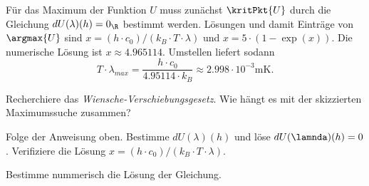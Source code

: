 \documentclass{article}
\begin{document}
    Für das Maximum der Funktion $U$ muss zunächst $\kritPkt{U}$ durch die Gleichung $dU(\lambda)(h) = 0_\R$ bestimmt werden. Lösungen und damit Einträge von $\argmax{U}$ sind $x=(h\cdot c_0)/(k_B\cdot T\cdot\lambda)$ und $x = 5\cdot (1-\exp(x))$. Die numerische Lösung ist $x\approx 4.965114$. Umstellen liefert sodann 
    \[T\cdot\lambda_\textit{max} = \frac{h\cdot c_0}{4.95114\cdot k_B}\approx 2.998\cdot 10^{-3}\si{\metre\kelvin}.\]

    \begin{Aufgabe}
        \nr{} Recherchiere das \emph{Wiensche-Verschiebungsgesetz}. Wie hängt es mit der skizzierten Maximumssuche zusammen?

        \nr{} Folge der Anweisung oben. Bestimme $dU(\lambda)(h)$ und löse $dU(\lamnda)(h) = 0$. Verifiziere die Lösung $x=(h\cdot c_0)/(k_B\cdot T\cdot\lambda)$. 

        \nr{} Bestimme nummerisch die Lösung der Gleichung. 
    \end{Aufgabe}
\end{document}
